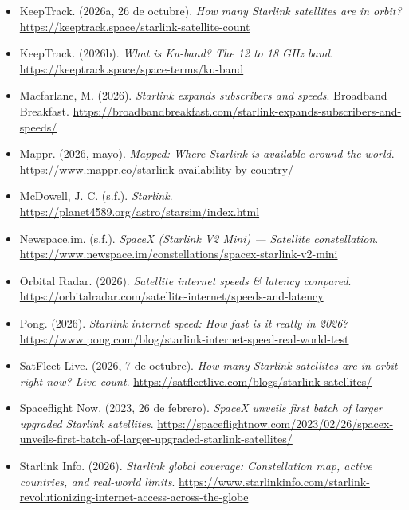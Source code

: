 \documentclass[12pt,letterpaper]{article}
\begin{document}
\begin{itemize}[leftmargin=1.5em,itemsep=7pt]
\item[] KeepTrack. (2026a, 26 de octubre). \textit{How many Starlink satellites are in orbit?} \url{https://keeptrack.space/starlink-satellite-count}

\item[] KeepTrack. (2026b). \textit{What is Ku-band? The 12 to 18 GHz band}. \url{https://keeptrack.space/space-terms/ku-band}

\item[] Macfarlane, M. (2026). \textit{Starlink expands subscribers and speeds}. Broadband Breakfast. \url{https://broadbandbreakfast.com/starlink-expands-subscribers-and-speeds/}

\item[] Mappr. (2026, mayo). \textit{Mapped: Where Starlink is available around the world}. \url{https://www.mappr.co/starlink-availability-by-country/}

\item[] McDowell, J. C. (s.f.). \textit{Starlink}. \url{https://planet4589.org/astro/starsim/index.html}

\item[] Newspace.im. (s.f.). \textit{SpaceX (Starlink V2 Mini) --- Satellite constellation}. \url{https://www.newspace.im/constellations/spacex-starlink-v2-mini}

\item[] Orbital Radar. (2026). \textit{Satellite internet speeds \& latency compared}. \url{https://orbitalradar.com/satellite-internet/speeds-and-latency}

\item[] Pong. (2026). \textit{Starlink internet speed: How fast is it really in 2026?} \url{https://www.pong.com/blog/starlink-internet-speed-real-world-test}

\item[] SatFleet Live. (2026, 7 de octubre). \textit{How many Starlink satellites are in orbit right now? Live count}. \url{https://satfleetlive.com/blogs/starlink-satellites/}

\item[] Spaceflight Now. (2023, 26 de febrero). \textit{SpaceX unveils first batch of larger upgraded Starlink satellites}. \url{https://spaceflightnow.com/2023/02/26/spacex-unveils-first-batch-of-larger-upgraded-starlink-satellites/}

\item[] Starlink Info. (2026). \textit{Starlink global coverage: Constellation map, active countries, and real-world limits}. \url{https://www.starlinkinfo.com/starlink-revolutionizing-internet-access-across-the-globe}


\end{itemize}
\end{document}
